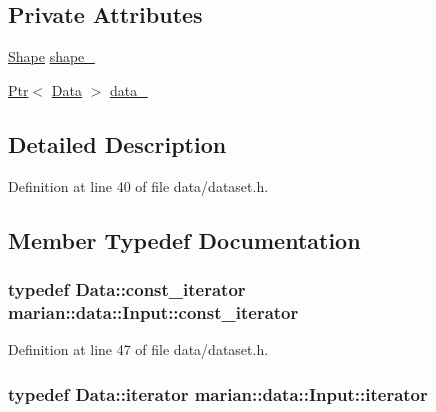 \subsection*{Private Attributes}
\begin{DoxyCompactItemize}
\item 
\hyperlink{structmarian_1_1Shape}{Shape} \hyperlink{classmarian_1_1data_1_1Input_a0503e6dd9e0d87d5af3779824ddaea78}{shape\+\_\+}
\item 
\hyperlink{namespacemarian_ad1a373be43a00ef9ce35666145137b08}{Ptr}$<$ \hyperlink{namespacemarian_1_1data_a5801e80ecb76ee38a5ac080f08d9646c}{Data} $>$ \hyperlink{classmarian_1_1data_1_1Input_a16dd53788b952dfd6f4d422b857d33ca}{data\+\_\+}
\end{DoxyCompactItemize}


\subsection{Detailed Description}


Definition at line 40 of file data/dataset.\+h.



\subsection{Member Typedef Documentation}
\subsubsection[{\texorpdfstring{const\+\_\+iterator}{const_iterator}}]{\setlength{\rightskip}{0pt plus 5cm}typedef Data\+::const\+\_\+iterator {\bf marian\+::data\+::\+Input\+::const\+\_\+iterator}}\hypertarget{classmarian_1_1data_1_1Input_a3b3281863ff04a0d9f5af5e96ee42bb6}{}\label{classmarian_1_1data_1_1Input_a3b3281863ff04a0d9f5af5e96ee42bb6}


Definition at line 47 of file data/dataset.\+h.

\subsubsection[{\texorpdfstring{iterator}{iterator}}]{\setlength{\rightskip}{0pt plus 5cm}typedef Data\+::iterator {\bf marian\+::data\+::\+Input\+::iterator}}\hypertarget{classmarian_1_1data_1_1Input_a94a106c4c6881b4e3ad3796dbddfded2}{}\label{classmarian_1_1data_1_1Input_a94a106c4c6881b4e3ad3796dbddfded2}


